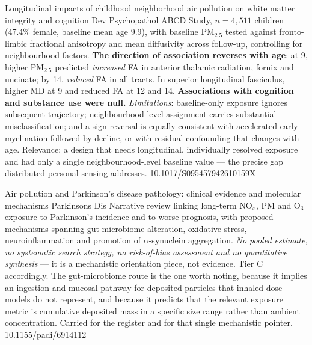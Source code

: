 \documentclass[10pt]{article}
\begin{document}
{Longitudinal impacts of childhood neighborhood air pollution on white matter integrity
and cognition}
{Dev Psychopathol}
{ABCD Study, $n=4{,}511$ children (47.4\% female, baseline mean age 9.9), with baseline
PM$_{2.5}$ tested against fronto-limbic fractional anisotropy and mean diffusivity across
follow-up, controlling for neighbourhood factors. \textbf{The direction of association
reverses with age}: at 9, higher PM$_{2.5}$ predicted \emph{increased} FA in anterior
thalamic radiation, fornix and uncinate; by 14, \emph{reduced} FA in all tracts. In
superior longitudinal fasciculus, higher MD at 9 and reduced FA at 12 and 14.
\textbf{Associations with cognition and substance use were null.} \emph{Limitations}:
baseline-only exposure ignores subsequent trajectory; neighbourhood-level assignment
carries substantial misclassification; and a sign reversal is equally consistent with
accelerated early myelination followed by decline, or with residual confounding that
changes with age. Relevance: a design that needs longitudinal, individually resolved
exposure and had only a single neighbourhood-level baseline value --- the precise gap
distributed personal sensing addresses.}
{10.1017/S095457942610159X}

{Air pollution and Parkinson's disease pathology: clinical evidence and molecular
mechanisms}
{Parkinsons Dis}
{Narrative review linking long-term NO$_x$, PM and O$_3$ exposure to Parkinson's incidence
and to worse prognosis, with proposed mechanisms spanning gut-microbiome alteration,
oxidative stress, neuroinflammation and promotion of $\alpha$-synuclein aggregation.
\emph{No pooled estimate, no systematic search strategy, no risk-of-bias assessment and
no quantitative synthesis} --- it is a mechanistic orientation piece, not evidence.
Tier C accordingly. The gut-microbiome route is the one worth noting, because it implies
an ingestion and mucosal pathway for deposited particles that inhaled-dose models do not
represent, and because it predicts that the relevant exposure metric is cumulative
deposited mass in a specific size range rather than ambient concentration. Carried for
the register and for that single mechanistic pointer.}
{10.1155/padi/6914112}

\end{document}
